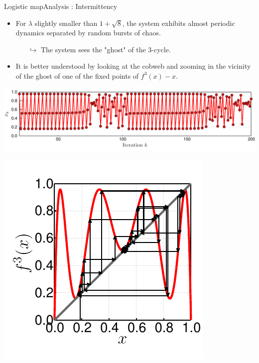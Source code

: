 \documentclass[usenames,dvipsnames,svgnames,10pt,aspectratio=169]{beamer}
\begin{document}
\begin{frame}[t, c]{Logistic map}{Analysis : Intermittency}
	\begin{minipage}{.68\textwidth}
		\begin{itemize}
			\item For \( \lambda \) slightly smaller than \(1 + \sqrt{8} \), the system exhibits almost periodic dynamics separated by random bursts of chaos.
			\begin{itemize}
				\item[\( \hookrightarrow \)] The system sees the "ghost" of the 3-cycle.
			\end{itemize}

			\item It is better understood by looking at the cobweb and zooming in the vicinity of the ghost of one of the fixed points of \(f^{3}(x)-x\).
		\end{itemize}

		\bigskip

		\includegraphics[width=\textwidth]{cycle_3_intermittency_time_series}
	\end{minipage}%
	\hfill
	\begin{minipage}{.28\textwidth}
		\centering
		\includegraphics[width=\textwidth]{cycle_3_intermittency}
	\end{minipage}

	\vspace{1cm}
\end{frame}
\end{document}
